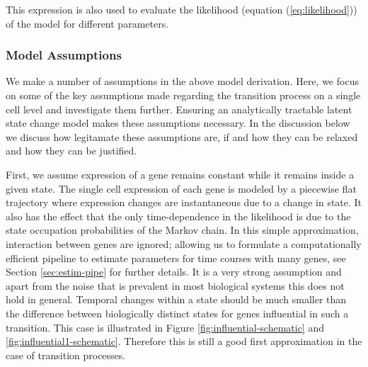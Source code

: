This expression is also used to evaluate the likelihood (equation (\ref{eq:likelihood})) of the model for different parameters.

\subsubsection{Model Assumptions}
\label{sec:model-assumptions}

We make a number of assumptions in the above model derivation. Here, we focus on some of the key assumptions made regarding the transition process on a single cell level and investigate them further. Ensuring an analytically tractable latent state change model makes these assumptions necessary. In the discussion below we discuss how legitamate these assumptions are, if and how they can be relaxed and how they can be justified.

First, we assume expression of a gene remains constant while it remains inside a given state. The single cell expression of each gene is modeled by a piecewise flat trajectory where expression changes are instantaneous due to a change in state. It also has the effect that the only time-dependence in the likelihood is due to the state occupation probabilities of the Markov chain. In this simple approximation, interaction between genes are ignored; allowing us to formulate a computationally efficient pipeline to estimate parameters for time courses with many genes, see Section \ref{sec:estim-pipe} for further details. It is a very strong assumption and apart from the noise that is prevalent in most biological systems
this does not hold in general. Temporal changes within a state should be much smaller than the difference between biologically distinct states for genes influential in such a transition. This case is illustrated in Figure \ref{fig:influential-schematic} and \ref{fig:influential1-schematic}. Therefore this is still a good first approximation in the case of transition processes. 

